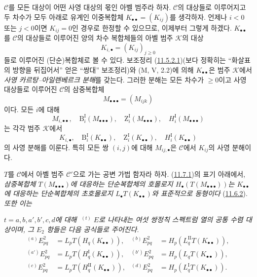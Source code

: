 \begin{env}[11.7.1]
\label{0.11.7.1-fr}
$\mathcal C$를 모든 대상이 어떤 사영 대상의 몫인 아벨 범주라 하자.
$\mathcal C$의 대상들로 이루어지고 두 차수가 모두 아래로 유계인
이중복합체 $K_{\bullet\bullet}=(K_{ij})$를 생각하자. 언제나
$i<0$ 또는 $j<0$이면 $K_{ij}=0$인 경우로 한정할 수 있으므로,
이제부터 그렇게 하겠다. $K_{\bullet\bullet}$를 $\mathcal C$의
대상들로 이루어진 양의 차수 복합체들의 아벨 범주 $\mathcal K$의 대상
\[
K_{i,\bullet}=(K_{ij})_{j\geq0}
\]
들로 이루어진 (단순)복합체로 볼 수 있다. 보조정리
(\hyperref[0.11.5.2.1-ko]{11.5.2.1})(보다 정확히는 ``화살표의
방향을 뒤집어서'' 얻은 ``쌍대'' 보조정리)와 (M, V, 2.2)에 의해
$K_{\bullet\bullet}$은 범주 $\mathcal K$에서
\emph{사영 카르탕--아일렌베르크 분해}를 갖는다. 그러한 분해는 모든
차수가 $\geq0$이고 사영 대상들로 이루어진 $\mathcal C$의 삼중복합체
\[
M_{\bullet\bullet\bullet}=(M_{ijk})
\]
이다. 모든 $i$에 대해
\[
M_{i,\bullet\bullet},\quad
\mathrm B_i^{\mathrm I}(M_{\bullet\bullet\bullet}),\quad
\mathrm Z_i^{\mathrm I}(M_{\bullet\bullet\bullet}),\quad
H_i^{\mathrm I}(M_{\bullet\bullet\bullet})
\]
는 각각 범주 $\mathcal K$에서
\[
K_{i,\bullet},\quad
\mathrm B_i^{\mathrm I}(K_{\bullet\bullet}),\quad
\mathrm Z_i^{\mathrm I}(K_{\bullet\bullet}),\quad
H_i^{\mathrm I}(K_{\bullet\bullet})
\]
의 사영 분해를 이룬다. 특히 모든 쌍 $(i,j)$에 대해
$M_{ij,\bullet}$은 $\mathcal C$에서 $K_{ij}$의 사영 분해이다.
\end{env}

\begin{proposition}[11.7.2]
\label{0.11.7.2-fr}
$T$를 $\mathcal C$에서 아벨 범주 $\mathcal C'$으로 가는 공변 가법
함자라 하자. (\hyperref[0.11.7.1-fr]{11.7.1})의 표기 아래에서,
\emph{삼중복합체 $T(M_{\bullet\bullet\bullet})$에 대응하는
단순복합체의 호몰로지
$H_\bullet(T(M_{\bullet\bullet\bullet}))$는
$K_{\bullet\bullet}$에 대응하는 단순복합체의 초호몰로지
$L_\bullet T(K_{\bullet\bullet})$와 표준적으로 동형이다}
(\hyperref[0.11.6.2-fr]{11.6.2}). \emph{또한 이는}


\emph{$t=a,b,a',b',c,d$에 대해 $\mathop{}^{(t)}E$로 나타내는 여섯
쌍정칙 스펙트럼 열의 공통 수렴 대상이며, 그 $E_2$ 항들은 다음
공식들로 주어진다.}
\[
\begin{aligned}
{}^{(a)}E^2_{pq}&=L_pT(H_q(K_{\bullet\bullet})),&
{}^{(b)}E^2_{pq}&=H_p(L_q^{\mathrm{II}}T(K_{\bullet\bullet})),\\
{}^{(a')}E^2_{pq}&=L_pT(H_q^{\mathrm I}(K_{\bullet\bullet})),&
{}^{(b')}E^2_{pq}&=H_p(L_qT(K_{\bullet\bullet})),\\
{}^{(c)}E^2_{pq}&=L_pT(H_q^{\mathrm{II}}(K_{\bullet\bullet})),&
{}^{(d)}E^2_{pq}&=H_p(L_q^{\mathrm I}T(K_{\bullet\bullet})).
\end{aligned}
\]
\end{proposition}

